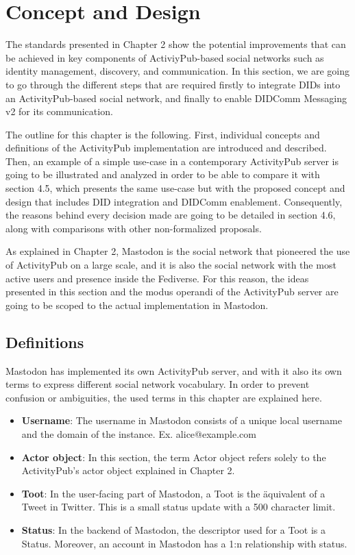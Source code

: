 \chapter{Concept and Design}
\label{cha:conceptanddesign}
 
The standards presented in Chapter 2 show the potential improvements that can be achieved in key components of ActiviyPub-based social networks such as identity management, discovery, and communication. In this section, we are going to go through the different steps that are required firstly to integrate DIDs into an ActivityPub-based social network, and finally to enable DIDComm Messaging v2 for its communication.

The outline for this chapter is the following. First, individual concepts and definitions of the ActivityPub implementation are introduced and described. Then, an example of a simple use-case in a contemporary ActivityPub server is going to be illustrated and analyzed in order to be able to compare it with section 4.5, which presents the same use-case but with the proposed concept and design that includes DID integration and DIDComm enablement. Consequently, the reasons behind every decision made are going to be detailed in section 4.6, along with comparisons with other non-formalized proposals. 
 
As explained in Chapter 2, Mastodon is the social network that pioneered the use of ActivityPub on a large scale, and it is also the social network with the most active users and presence inside the Fediverse. For this reason, the ideas presented in this section and the modus operandi of the ActivityPub server are going to be scoped to the actual implementation in Mastodon.  
 
 
\section{Definitions}
Mastodon has implemented its own ActivityPub server, and with it also its own terms to express different social network vocabulary. In order to prevent confusion or ambiguities, the used terms in this chapter are explained here. 
 
\begin{itemize}
  \item \textbf{Username}: The username in Mastodon consists of a unique local username and the domain of the instance. Ex. alice@example.com
  \item \textbf{Actor object}: In this section, the term Actor object refers solely to the ActivityPub's actor object explained in Chapter 2. 
  \item \textbf{Toot}: In the user-facing part of Mastodon, a Toot is the äquivalent of a Tweet in Twitter. This is a small status update with a 500 character limit.
  \item \textbf{Status}: In the backend of Mastodon, the descriptor used for a Toot is a Status. Moreover, an account in Mastodon has a 1:n relationship with status.
\end{itemize}

